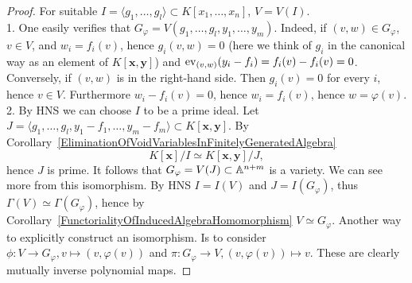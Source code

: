 \begin{proof}
    For suitable $I=\langle g_1,\dots,g_l\rangle \subset K[x_1,\dots,x_n]$, $V=V(I)$.\\
    1. One easily verifies that $G_\varphi = V(g_1,\dots,g_l,y_1,\dots,y_m)$. Indeed, if $(v,w)\in G_\varphi$, $v\in V$, and $w_i = f_i(v)$, hence $g_i(v,w)=0$ (here we think of $g_i$ in the canonical way as an element of $K[\mathbf{x},\mathbf{y}]$) and $\mathrm{ev}_{(v,w)}(y_i-f_i)=f_i(v)-f_i(v)=0$. Conversely, if $(v,w)$ is in the right-hand side. Then $g_i(v)=0$ for every $i$, hence $v\in V$. Furthermore $w_i-f_i(v)=0$, hence $w_i=f_i(v)$, hence $w = \varphi(v)$.\\
    2. By HNS we can choose $I$ to be a prime ideal. Let $J=\langle g_1,\dots,g_l,y_1-f_1,\dots,y_m-f_m\rangle \subset K[\mathbf{x},\mathbf{y}]$. By Corollary~\ref{EliminationOfVoidVariablesInFinitelyGeneratedAlgebra} $$K[\mathbf{x}]/I\simeq K[\mathbf{x},\mathbf{y}]/J,$$ 
    hence $J$ is prime. It follows that $G_\varphi = V(J)\subset \mathbb{A}^{n+m}$ is a variety. We can see more from this isomorphism. By HNS $I = I(V)$ and $J = I(G_\varphi)$, thus $\Gamma(V)\simeq \Gamma(G_\varphi)$, hence by Corollary~\ref{FunctorialityOfInducedAlgebraHomomorphism} $V\simeq G_\varphi$. Another way to explicitly construct an isomorphism. Is to consider $\phi: V \rightarrow G_\varphi, v\mapsto (v,\varphi(v))$ and $\pi : G_\varphi \rightarrow V, (v,\varphi(v))\mapsto v$. These are clearly mutually inverse polynomial maps.  
\end{proof}
